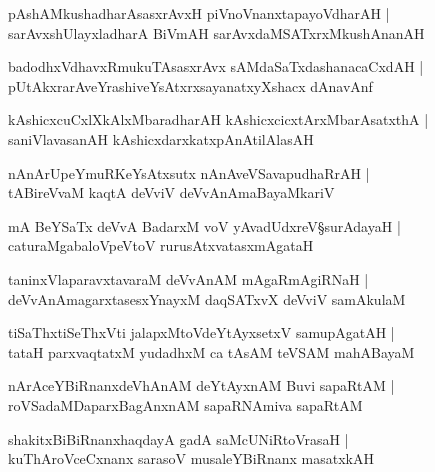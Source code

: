 \begin{shloka}
pAshAMkushadharAsasxrAvxH piVnoVnanxtapayoVdharAH |\\sarAvxshUlayxladharA BiVmAH sarAvxdaMSATxrxMkushAnanAH
\end{shloka}

\begin{shloka}
badodhxVdhavxRmukuTAsasxrAvx sAMdaSaTxdashanacaCxdAH |\\ pUtAkxrarAveYrashiveYsAtxrxsayanatxyXshacx dAnavAnf
\end{shloka}

\begin{shloka}
kAshicxcuCxlXkAlxMbaradharAH kAshicxcicxtArxMbarAsatxthA |\\ saniVlavasanAH kAshicxdarxkatxpAnAtilAlasAH
\end{shloka}

\begin{shloka}
nAnArUpeYmuRKeYsAtxsutx nAnAveVSavapudhaRrAH |\\ tABireVvaM kaqtA deVviV deVvAnAmaBayaMkariV
\end{shloka}

\begin{shloka}
mA BeYSaTx deVvA BadarxM voV yAvadUdxreV\S surAdayaH |\\ caturaMgabaloVpeVtoV rurusAtxvatasxmAgataH
\end{shloka}

\begin{shloka}
taninxVlaparavxtavaraM deVvAnAM mAgaRmAgiRNaH |\\ deVvAnAmagarxtasesxYnayxM daqSATxvX deVviV samAkulaM 
\end{shloka}

\begin{shloka}
tiSaThxtiSeThxVti jalapxMtoVdeYtAyxsetxV samupAgatAH |\\ tataH parxvaqtatxM yudadhxM ca tAsAM teVSAM mahABayaM
\end{shloka}

\begin{shloka}
nArAceYBiRnanxdeVhAnAM deYtAyxnAM Buvi sapaRtAM |\\ roVSadaMDaparxBagAnxnAM sapaRNAmiva sapaRtAM
\end{shloka}

\begin{shloka}
shakitxBiBiRnanxhaqdayA gadA saMcUNiRtoVrasaH |\\ kuThAroVceCxnanx sarasoV musaleYBiRnanx masatxkAH
\end{shloka}


